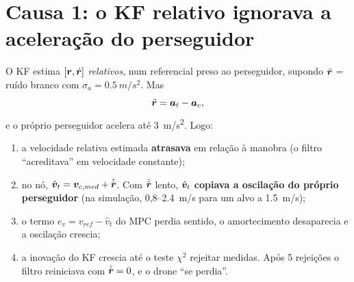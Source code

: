 \section{Causa 1: o KF relativo ignorava a aceleração do perseguidor}
O KF estima $[\bm{r},\dot{\bm{r}}]$ \emph{relativos}, num referencial preso ao perseguidor,
supondo $\ddot{\bm{r}}$ = ruído branco com $\sigma_a=\SI{0,5}{m/s^2}$. Mas
\begin{equation}
  \ddot{\bm{r}} = \bm{a}_t - \bm{a}_c ,
\end{equation}
e o próprio perseguidor acelera até \SI{3}{m/s^2}. Logo:
\begin{enumerate}
  \item a velocidade relativa estimada \textbf{atrasava} em relação à manobra (o filtro
        ``acreditava'' em velocidade constante);
  \item no nó, $\hat{\bm{v}}_t=\bm{v}_{c,med}+\hat{\dot{\bm{r}}}$. Com $\hat{\dot{\bm{r}}}$ lento,
        $\hat{\bm{v}}_t$ \textbf{copiava a oscilação do próprio perseguidor} (na simulação,
        0,8--\SI{2,4}{m/s} para um alvo a \SI{1,5}{m/s});
  \item o termo $e_v=v_{ref}-\hat v_t$ do MPC perdia sentido, o amortecimento
        desaparecia e a oscilação crescia;
  \item a inovação do KF crescia até o teste $\chi^2$ rejeitar medidas. Após 5 rejeições
        o filtro reiniciava com $\hat{\dot{\bm{r}}}=0$, e o drone ``se perdia''.
\end{enumerate}

